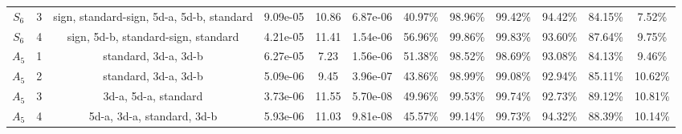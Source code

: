 \begin{tabular}{cccccccccccc}
  $S_{6}$ &    3 &              sign, standard-sign, 5d-a, 5d-b, standard &  9.09e-05 &     10.86 &  6.87e-06 &   40.97\% &   98.96\% &   99.42\% &   94.42\% & 84.15\% &             7.52\% \\
  $S_{6}$ &    4 &                    sign, 5d-b, standard-sign, standard &  4.21e-05 &     11.41 &  1.54e-06 &   56.96\% &   99.86\% &   99.83\% &   93.60\% & 87.64\% &             9.75\% \\
  $A_{5}$ &    1 &                                   standard, 3d-a, 3d-b &  6.27e-05 &      7.23 &  1.56e-06 &   51.38\% &   98.52\% &   98.69\% &   93.08\% & 84.13\% &             9.46\% \\
  $A_{5}$ &    2 &                                   standard, 3d-a, 3d-b &  5.09e-06 &      9.45 &  3.96e-07 &   43.86\% &   98.99\% &   99.08\% &   92.94\% & 85.11\% &            10.62\% \\
  $A_{5}$ &    3 &                                   3d-a, 5d-a, standard &  3.73e-06 &     11.55 &  5.70e-08 &   49.96\% &   99.53\% &   99.74\% &   92.73\% & 89.12\% &            10.81\% \\
  $A_{5}$ &    4 &                             5d-a, 3d-a, standard, 3d-b &  5.93e-06 &     11.03 &  9.81e-08 &   45.57\% &   99.14\% &   99.73\% &   94.32\% & 88.39\% &            10.14\% \\
\bottomrule
\end{tabular}

